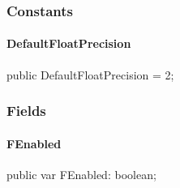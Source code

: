 \documentclass{report}
\begin{document}
\subsubsection*{\large{\textbf{Constants}}\normalsize\hspace{1ex}\hfill}
\paragraph*{DefaultFloatPrecision}\hspace*{\fill}

\begin{list}{}{
\setlength{\itemindent}{0cm}
\setlength{\listparindent}{0cm}
\setlength{\leftmargin}{\evensidemargin}
\addtolength{\leftmargin}{\tmplength}
\settowidth{\labelsep}{X}
\addtolength{\leftmargin}{\labelsep}
\setlength{\labelwidth}{\tmplength}
}
\begin{flushleft}
\item[\textbf{Declaration}\hfill]
\begin{ttfamily}
public DefaultFloatPrecision = 2;\end{ttfamily}


\end{flushleft}
\end{list}
\subsubsection*{\large{\textbf{Fields}}\normalsize\hspace{1ex}\hfill}
\paragraph*{FEnabled}\hspace*{\fill}

\begin{list}{}{
\setlength{\itemindent}{0cm}
\setlength{\listparindent}{0cm}
\setlength{\leftmargin}{\evensidemargin}
\addtolength{\leftmargin}{\tmplength}
\settowidth{\labelsep}{X}
\addtolength{\leftmargin}{\labelsep}
\setlength{\labelwidth}{\tmplength}
}
\begin{flushleft}
\item[\textbf{Declaration}\hfill]
\begin{ttfamily}
public var FEnabled: boolean;\end{ttfamily}


\end{flushleft}
\end{list}
\end{document}
